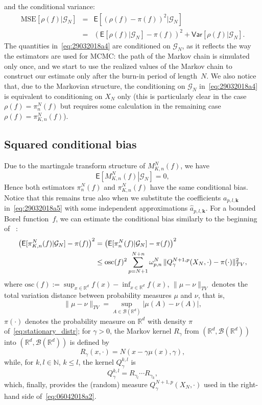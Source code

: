 \documentclass[aap,preprint]{imsart}
\begin{document}
and the conditional variance:
\begin{eqnarray}\label{eq:29032018a4}
\mathrm{MSE}\left[\rho(f)|\mathcal G_N\right]
&=&\mathsf{E}\left[(\rho(f)-\pi(f))^2|\mathcal G_N\right]
\\
\nonumber
&=&\left(\mathsf{E}[\rho(f)|\mathcal G_N]-\pi(f)\right)^2
+\mathsf{Var}\left[\rho(f)|\mathcal G_N\right].
\end{eqnarray}
The quantities in~\eqref{eq:29032018a4}
are conditioned on $\mathcal G_N$,
as it reflects the way the estimators are used for MCMC:
the path of the Markov chain is simulated only once,
and we start to use the realized values
of the Markov chain to construct
our estimate only after the burn-in period of length~$N$.
We also notice that, due to the Markovian structure,
the conditioning on $\mathcal G_N$
in~\eqref{eq:29032018a4}
is equivalent to conditioning on $X_N$ only
(this is particularly clear in the case $\rho(f)=\pi_n^N(f)$
but requires some calculation
in the remaining case $\rho(f)=\pi_{K,n}^N(f)$).


\subsection{Squared conditional bias}
Due to the martingale transform structure
of $M_{K,n}^N(f)$,
we have
\[
\mathsf E\left[\left.M_{K,n}^N(f)\right|\mathcal G_N\right]=0,
\]
Hence both estimators
$\pi_n^N(f)$ and $\pi_{K,n}^N(f)$ have the same conditional bias.
Notice that this remains true also when we substitute
the coefficients $a_{p,l,\mathbf{k}}$ in~\eqref{eq:29032018a5}
with some independent approximations $\widehat a_{p,l,\mathbf{k}}.$ For a bounded Borel function~$f$,
we can estimate the conditional bias
similarly to the beginning of ~\cite[Section~4]{durmus:moulines:2017}:
\begin{align}
\left(\mathsf{E}[\pi_{K,n}^N(f)|\mathcal G_N]-\pi(f)\right)^2
&=\left(\mathsf{E}[\pi_{n}^N(f)|\mathcal G_N]-\pi(f)\right)^2
\label{eq:06042018a2}\\
&\le
\mathrm{osc}(f)^2
\sum_{p=N+1}^{N+n}
\omega_{p,n}^N\,
\|Q_\gamma^{N+1,p}(X_N,\cdot)-\pi(\cdot)\|_{TV}^2,
\notag
\end{align}
where
$\mathrm{osc}(f):=\sup_{x\in\mathbb R^d}f(x)-\inf_{x\in\mathbb R^d}f(x)$,
$\|\mu-\nu\|_{TV}$ denotes the total variation distance
between probability measures $\mu$ and $\nu$, that is,
$$
\|\mu-\nu\|_{TV}=\sup_{A\in\mathcal B(\mathbb R^d)}
|\mu(A)-\nu(A)|,
$$
$\pi(\cdot)$ denotes the probability measure on $\mathbb R^d$
with density $\pi$ of~\eqref{eq:stationary_distr};
for $\gamma>0$, the Markov kernel $R_\gamma$
from $(\mathbb R^d,\mathcal B(\mathbb R^d))$
into $(\mathbb R^d,\mathcal B(\mathbb R^d))$
is defined by
$$
R_\gamma(x,\cdot)=N\left(x-\gamma\mu(x),\gamma\right),
$$
while, for $k,l\in\mathbb N$, $k\le l$,
the kernel $Q_\gamma^{k,l}$ is
$$
Q_\gamma^{k,l}=R_{\gamma_l}\cdots R_{\gamma_k},
$$
which, finally, provides the (random) measure
$Q_\gamma^{N+1,p}(X_N,\cdot)$
used in the right-hand side of~\eqref{eq:06042018a2}.
\end{document}
